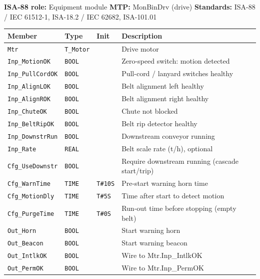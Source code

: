 {\small\textbf{ISA-88 role:} Equipment module \quad \textbf{MTP:} MonBinDrv (drive) \quad \textbf{Standards:} ISA-88 /\allowbreak{} IEC 61512-1, ISA-18.2 /\allowbreak{} IEC 62682, ISA-101.01}
{\footnotesize
\begin{longtable}{@{}>{\raggedright\arraybackslash}p{3.4cm}>{\raggedright\arraybackslash}p{3.3cm}>{\raggedright\arraybackslash}p{1.3cm}>{\raggedright\arraybackslash}p{6.4cm}@{}}
\toprule
\rowcolor{tblhead}\textbf{Member} & \textbf{Type} & \textbf{Init} & \textbf{Description} \\
\midrule
\endhead
\texttt{Mtr} & \texttt{T\_Motor} &  & Drive motor \\
\texttt{Inp\_MotionOK} & \texttt{BOOL} &  & Zero-speed switch: motion detected \\
\texttt{Inp\_PullCordOK} & \texttt{BOOL} &  & Pull-cord /\allowbreak{} lanyard switches healthy \\
\texttt{Inp\_AlignLOK} & \texttt{BOOL} &  & Belt alignment left healthy \\
\texttt{Inp\_AlignROK} & \texttt{BOOL} &  & Belt alignment right healthy \\
\texttt{Inp\_ChuteOK} & \texttt{BOOL} &  & Chute not blocked \\
\texttt{Inp\_BeltRipOK} & \texttt{BOOL} &  & Belt rip detector healthy \\
\texttt{Inp\_DownstrRun} & \texttt{BOOL} &  & Downstream conveyor running \\
\texttt{Inp\_Rate} & \texttt{REAL} &  & Belt scale rate (t/\allowbreak{}h), optional \\
\texttt{Cfg\_UseDownstr} & \texttt{BOOL} &  & Require downstream running (cascade start/\allowbreak{}trip) \\
\texttt{Cfg\_WarnTime} & \texttt{TIME} & \texttt{T\#10S} & Pre-start warning horn time \\
\texttt{Cfg\_MotionDly} & \texttt{TIME} & \texttt{T\#5S} & Time after start to detect motion \\
\texttt{Cfg\_PurgeTime} & \texttt{TIME} & \texttt{T\#0S} & Run-out time before stopping (empty belt) \\
\texttt{Out\_Horn} & \texttt{BOOL} &  & Start warning horn \\
\texttt{Out\_Beacon} & \texttt{BOOL} &  & Start warning beacon \\
\texttt{Out\_IntlkOK} & \texttt{BOOL} &  & Wire to Mtr.Inp\_IntlkOK \\
\texttt{Out\_PermOK} & \texttt{BOOL} &  & Wire to Mtr.Inp\_PermOK \\

\end{longtable}}
